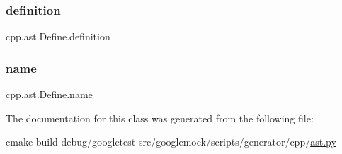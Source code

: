 \subsubsection{\texorpdfstring{definition}{definition}}
{\footnotesize\ttfamily cpp.\+ast.\+Define.\+definition}

\mbox{\label{classcpp_1_1ast_1_1Define_a8879216f09e88f79d7baa49bcfa10ebd}} 
\subsubsection{\texorpdfstring{name}{name}}
{\footnotesize\ttfamily cpp.\+ast.\+Define.\+name}



The documentation for this class was generated from the following file\+:\begin{DoxyCompactItemize}
\item 
cmake-\/build-\/debug/googletest-\/src/googlemock/scripts/generator/cpp/\mbox{\hyperlink{ast_8py}{ast.\+py}}\end{DoxyCompactItemize}
